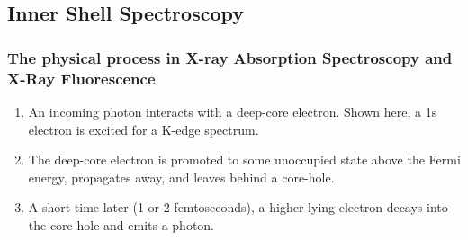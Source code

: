 \documentclass[10pt, xcolor=x11names, compress]{beamer}
\begin{document}
\subsection[Spectroscopy]{Inner Shell Spectroscopy}


\begin{frame}
  \frametitle{The physical process in X-ray Absorption
    Spectroscopy and X-Ray Fluorescence}

  \begin{center}
%
%
  \end{center}


  \begin{enumerate}[<+->]
  \item An incoming photon interacts with a deep-core electron.  Shown
    here, a 1s electron is excited for a K-edge spectrum.
  \item The deep-core electron is promoted to some unoccupied state
    above the Fermi energy, propagates away, and leaves behind a
    core-hole.
  \item A short time later (1 or 2 femtoseconds), a higher-lying
    electron decays into the core-hole and emits a photon.
  \end{enumerate}
\end{frame}

\end{document}

